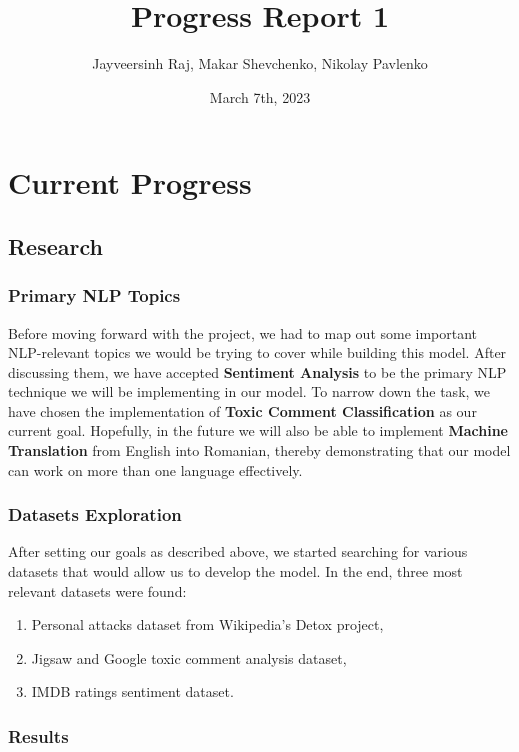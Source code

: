 \documentclass[]{article}
\title{Progress Report 1}
\author{Jayveersinh Raj, Makar Shevchenko, Nikolay Pavlenko}
\date{March 7th, 2023}
\begin{document}
	
	\maketitle
	
	\section{Current Progress}
	
	\subsection{Research}
	
	\subsubsection{Primary NLP Topics}
	
	Before moving forward with the project, we had to map out some important NLP-relevant topics we would be trying to cover while building this model. After discussing them, we have accepted \textbf{Sentiment Analysis} to be the primary NLP technique we will be implementing in our model. To narrow down the task, we have chosen the implementation of \textbf{Toxic Comment Classification} as our current goal. Hopefully, in the future we will also be able to implement \textbf{Machine Translation} from English into Romanian, thereby demonstrating that our model can work on more than one language effectively. \\
	
	\subsubsection{Datasets Exploration}
	
	After setting our goals as described above, we started searching for various datasets that would allow us to develop the model. In the end, three most relevant datasets were found:
	\begin{enumerate}
		\item Personal attacks dataset from Wikipedia's Detox project\cite{wikiDetox},
		\item Jigsaw and Google toxic comment analysis dataset\cite{jigsaw},
		\item IMDB ratings sentiment dataset\cite{imdb}.
	\end{enumerate}

	\subsubsection{Results}
	
\end{document}

